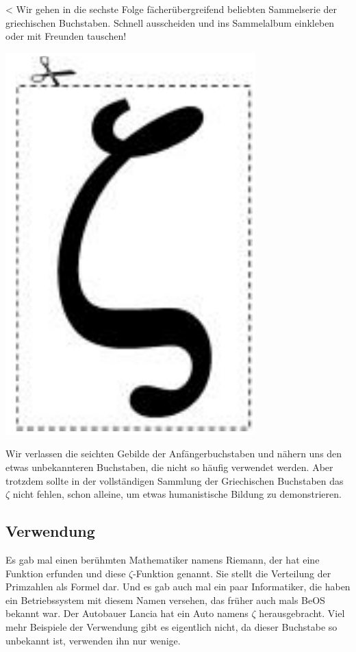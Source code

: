 <
{Wir gehen in die sechste Folge fächerübergreifend beliebten Sammelserie der griechischen Buchstaben.
    Schnell ausscheiden und ins Sammelalbum einkleben oder mit Freunden tauschen!}
{\vspace*{-1.5\baselineskip}\begin{center}
        \includegraphics[scale=0.4]{grafik/zeta.png}
    \end{center}
    \flushleft
    Wir verlassen die seichten Gebilde der Anfängerbuchstaben und
    nähern uns den etwas unbekannteren Buchstaben, die nicht so
    häufig verwendet werden. Aber trotzdem sollte in der vollständigen
    Sammlung der Griechischen Buchstaben das $\zeta$ nicht fehlen,
    schon alleine, um etwas humanistische Bildung zu demonstrieren.

    \subsection*{Verwendung}

    Es gab mal einen berühmten Mathematiker namens Riemann, der hat eine Funktion
    erfunden und diese $\zeta$-Funktion genannt. Sie stellt die Verteilung
    der Primzahlen als Formel dar. Und es gab auch mal ein paar Informatiker, die
    haben ein Betriebssystem mit diesem Namen versehen, das früher auch mals BeOS
    bekannt war.
    Der Autobauer Lancia hat ein Auto namens $\zeta$ herausgebracht.
    Viel mehr Beispiele der Verwendung gibt es eigentlich nicht, da dieser
    Buchstabe so unbekannt ist, verwenden ihn nur wenige.

}
